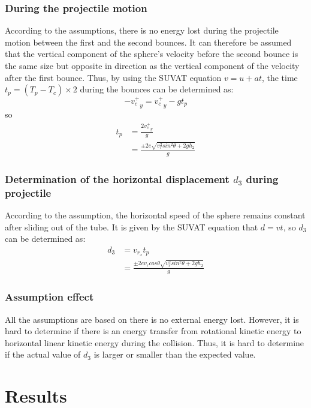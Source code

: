 \documentclass{article}
\begin{document}
        \subsubsection{During the projectile motion}
        According to the assumptions, there is no energy lost during the projectile motion between the first and the second bounces. It can therefore be assumed that the vertical component of the sphere's velocity before the second bounce is the same size but opposite in direction as the vertical component of the velocity after the first bounce. Thus, by using the SUVAT equation $v = u + at$, the time $t_p = (T_p - T_c)\times2 $ during the bounces can be determined as:
        $$-{v^+_c}_y = {v^+_c}_y - gt_p$$
        so 
        \begin{equation}
            \begin{aligned}
                t_p &= \frac{2{v^+_c}_y}{g}\\
                    &= \frac{\pm2e\sqrt{{v^2_{r}sin^2\theta}+2gh_2}}{g}
            \end{aligned}
        \end{equation}
        \subsubsection{Determination of the horizontal displacement $d_3$ during projectile}
        According to the assumption, the horizontal speed of the sphere remains constant after sliding out of the tube. It is given by the SUVAT equation that $d = vt$, so $d_3$ can be determined as:
        \begin{equation}
            \begin{aligned}
                d_3 &= v_{r_x}t_p\\
                &=  \frac{\pm2ev_rcos\theta\sqrt{{v^2_{r}sin^2\theta}+2gh_2}}{g}
            \end{aligned}
        \end{equation}
        \subsubsection{Assumption effect}
            All the assumptions are based on there is no external energy lost. However, it is hard to determine if there is an energy transfer from rotational kinetic energy to horizontal linear kinetic energy during the collision. Thus, it is hard to determine if the actual value of $d_3$ is larger or smaller than the expected value.
\section{Results}
\end{document}
